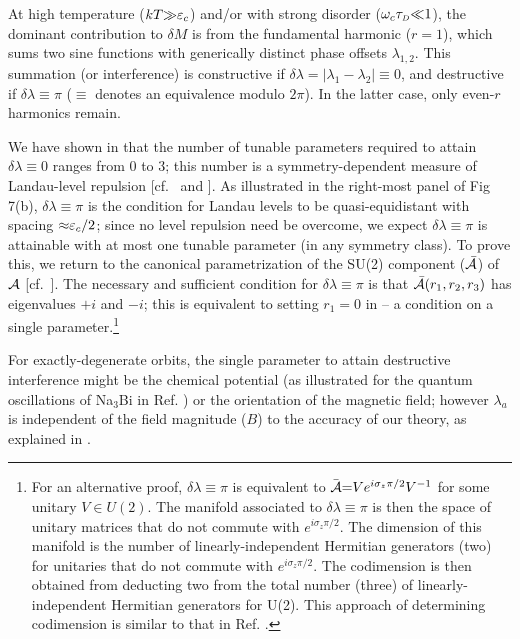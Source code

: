 \documentclass[aps, showpacs, twocolumn, notitlepage, superscriptaddress]{revtex4-1}
\begin{document}
At high temperature ($kT{\gg}\varepsilon_c$) and/or with strong disorder ($\omega_c\tau_{\scriptscriptstyle{D}}{\ll}1$), the dominant contribution to $\delta M$ is from the fundamental harmonic ($r{=}1$), which sums two sine functions with generically distinct phase offsets $\lambda_{1,2}$. This summation (or interference) is constructive if $\delta \lambda{=}|\lambda_1{-}\lambda_2|{\equiv}0$, and destructive if $\delta \lambda{\equiv}\pi$  ($\equiv$ denotes an equivalence modulo $2\pi$). In the latter case, only even-$r$ harmonics remain.

We have shown in  that  the number of tunable parameters required to attain  $\delta \lambda{\equiv}0$ ranges from $0$ to $3$; this number is a symmetry-dependent measure of Landau-level repulsion [cf.\  and ]. As illustrated in the right-most panel of Fig 7(b), $\delta \lambda{\equiv}\pi$ is the condition  for Landau levels to be quasi-equidistant  with spacing ${\approx}\varepsilon_c/2$; since no level repulsion need be overcome,
we expect $\delta \lambda{\equiv}\pi$ is attainable with at most one tunable parameter (in any symmetry class). To prove this, we return to the canonical parametrization of the SU(2) component (${\cal \bar{A}}$) of ${\cal A}$ [cf.\ ]. The necessary and sufficient condition for $\delta \lambda{\equiv}\pi$ is that ${\cal \bar{A}}(r_1,r_2,r_3)$ has eigenvalues $+i$ and $-i$; this is equivalent to setting $r_1{=}0$ in  -- a condition on a single parameter.\footnote{For an alternative proof,  $\delta \lambda{\equiv}\pi$ is equivalent to ${ \bar{\cal A}}{=}Ve^{i\sigma_z\pi/2}V^{-1}$ for some unitary $V\in U(2)$. The manifold associated to $\delta \lambda{\equiv}\pi$ is then the space of unitary matrices  that do not commute with $e^{i\sigma_z\pi/2}$. The dimension of this manifold is the number of linearly-independent Hermitian generators (two) for unitaries that do not commute with $e^{i\sigma_z\pi/2}$. The codimension is then obtained from deducting two from the total number (three)  of linearly-independent Hermitian generators  for U(2). This approach of determining codimension is similar to that in Ref. .} 

For exactly-degenerate orbits, the single parameter to attain destructive interference might be the chemical potential (as illustrated for the quantum oscillations of Na$_3$Bi in Ref. ) or the orientation of the magnetic field; however $\lambda_a$ is independent of the field magnitude ($B$) to the accuracy\cite{rothmag,fuchs_landau_2018,gao_zero-field_2017,fischbeck_review} of our theory, as explained in . 
\end{document}
